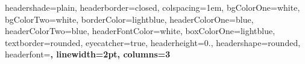 \documentclass[landscape,a0paper,fontscale=0.33]{baposter} %
\begin{document}
\begin{poster}
{
headershade=plain,
headerborder=closed, %
colspacing=1em, %
bgColorOne=white, %
bgColorTwo=white, %
borderColor=lightblue, %
headerColorOne=blue, %
headerColorTwo=blue, %
headerFontColor=white, %
boxColorOne=lightblue, %
textborder=rounded, %
eyecatcher=true, %
headerheight=0.\textheight, %
headershape=rounded, %
headerfont=\Large\bf\textsf, %
linewidth=2pt, %
columns=3
}
%
{} %
{} %
{} %
{} %

\sffamily
{}


\end{poster}
\end{document}
